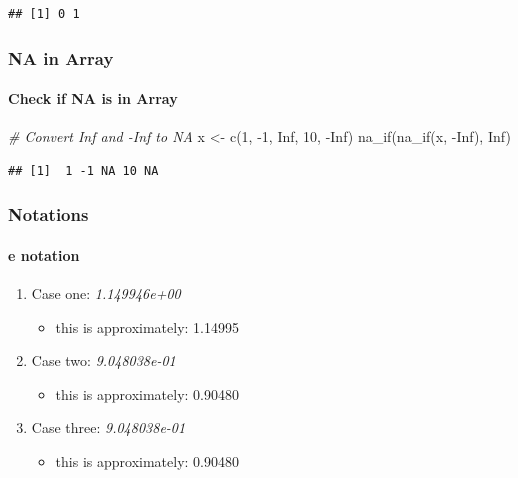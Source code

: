 \documentclass[
]{book}
\newenvironment{Shaded}{\begin{snugshade}}{\end{snugshade}}
\newcommand{\CommentTok}[1]{\textcolor[rgb]{0.56,0.35,0.01}{\textit{#1}}}
\newcommand{\ConstantTok}[1]{\textcolor[rgb]{0.00,0.00,0.00}{#1}}
\newcommand{\DecValTok}[1]{\textcolor[rgb]{0.00,0.00,0.81}{#1}}
\newcommand{\FunctionTok}[1]{\textcolor[rgb]{0.00,0.00,0.00}{#1}}
\newcommand{\NormalTok}[1]{#1}
\newcommand{\OtherTok}[1]{\textcolor[rgb]{0.56,0.35,0.01}{#1}}
\newcommand{\SpecialCharTok}[1]{\textcolor[rgb]{0.00,0.00,0.00}{#1}}
\providecommand{\tightlist}{%
  \setlength{\itemsep}{0pt}\setlength{\parskip}{0pt}}
\begin{document}
\begin{verbatim}
## [1] 0 1
\end{verbatim}

\hypertarget{na-in-array}{%
\subsubsection{NA in Array}\label{na-in-array}}

\hypertarget{check-if-na-is-in-array}{%
\paragraph{Check if NA is in Array}\label{check-if-na-is-in-array}}

\begin{Shaded}
\begin{Highlighting}[]
\CommentTok{\# Convert Inf and {-}Inf to NA}
\NormalTok{x }\OtherTok{\textless{}{-}} \FunctionTok{c}\NormalTok{(}\DecValTok{1}\NormalTok{, }\SpecialCharTok{{-}}\DecValTok{1}\NormalTok{, }\ConstantTok{Inf}\NormalTok{, }\DecValTok{10}\NormalTok{, }\SpecialCharTok{{-}}\ConstantTok{Inf}\NormalTok{)}
\FunctionTok{na\_if}\NormalTok{(}\FunctionTok{na\_if}\NormalTok{(x, }\SpecialCharTok{{-}}\ConstantTok{Inf}\NormalTok{), }\ConstantTok{Inf}\NormalTok{)}
\end{Highlighting}
\end{Shaded}

\begin{verbatim}
## [1]  1 -1 NA 10 NA
\end{verbatim}

\hypertarget{notations}{%
\subsubsection{Notations}\label{notations}}

\hypertarget{e-notation}{%
\paragraph{e notation}\label{e-notation}}

\begin{enumerate}
\def\labelenumi{\arabic{enumi}.}
\tightlist
\item
  Case one: \emph{1.149946e+00}

  \begin{itemize}
  \tightlist
  \item
    this is approximately: 1.14995
  \end{itemize}
\item
  Case two: \emph{9.048038e-01}

  \begin{itemize}
  \tightlist
  \item
    this is approximately: 0.90480
  \end{itemize}
\item
  Case three: \emph{9.048038e-01}

  \begin{itemize}
  \tightlist
  \item
    this is approximately: 0.90480
  \end{itemize}
\end{enumerate}
\end{document}
